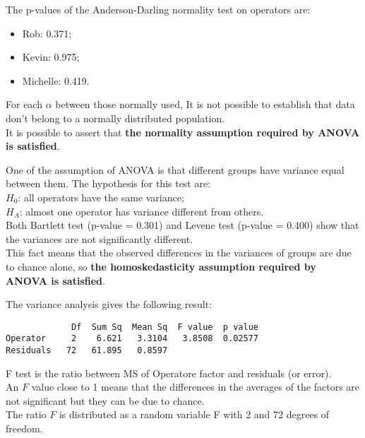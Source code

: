 \begin{frame}
  \vspace{0.25cm}
  The p-values of the Anderson-Darling normality test on operators are:
  \begin{itemize}
    \item Rob: 0.371;
    \item Kevin: 0.975;
    \item Michelle: 0.419.
  \end{itemize}
  \vspace{1cm}
  For each $ \alpha $ between those normally used, It is not possible to establish that data don't belong to a normally distributed population.\\
  \vspace{0.5cm}
  It is possible to assert that \textbf{the normality assumption required by ANOVA is satisfied}.
\end{frame}

\begin{frame}
  \vspace{0.25cm}
  One of the assumption of ANOVA is that different groups have variance equal between them. The hypothesis for this test are:\\ 
  $ H_0 $: all operators have the same variance;\\
  $ H_A $: almost one operator has variance different from others.\\
  \vspace{0.5cm}
  Both Bartlett test (p-value = 0.301) and Levene test (p-value = 0.400) show that the variances are not significantly different.\\
  \vspace{0.5cm}
  This fact means that the observed differences in the variances of groups are due to chance alone, so  \textbf{the homoskedasticity assumption required by ANOVA is satisfied}.
\end{frame}

\begin{frame}[fragile]
  \vspace{0.25cm}
  The variance analysis gives the following result:
  \begin{verbatim}
             Df  Sum Sq  Mean Sq  F value  p value  
Operator     2    6.621   3.3104   3.8508  0.02577
Residuals   72   61.895   0.8597  
  \end{verbatim}
  F test is the ratio between MS of Operatore factor and residuals (or error).\\
  \vspace{0.25cm}
  An $ F $ value close to 1 means that the differences in the averages of the factors are not significant but they can be due to chance.\\
  \vspace{0.25cm}
  The ratio $ F $ is distributed as a random variable F with 2 and 72 degrees of freedom.\\
\end{frame}

